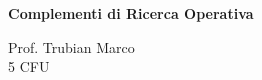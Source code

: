\documentclass[\main/main.tex]{subfiles}
\begin{document}
\begin{titlepage}
    \begin{center}
        \vspace*{1em}
        
        \textbf{\large{Complementi di Ricerca Operativa}}
        
        \vspace{1em}
        Prof. Trubian Marco
        \\
        \small{5 CFU}
        \vspace{1em}
        
		 
        
    \end{center}
\end{titlepage}
\end{document}
